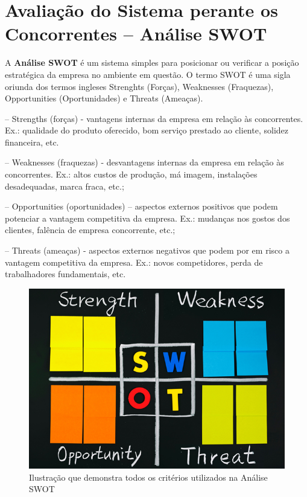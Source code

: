 \documentclass[graduacao,brazil]{ThesisPUC}
\begin{document}
\section{Avalia\c{c}\~{a}o do Sistema perante os Concorrentes -- An\'{a}lise SWOT}

A \textbf{An\'{a}lise SWOT} \'{e} um sistema simples para posicionar ou verificar a posi\c{c}\~{a}o estrat\'{e}gica
da empresa no ambiente em quest\~{a}o. O termo SWOT \'{e} uma sigla oriunda dos termos ingleses
Strenghts (Forças), Weaknesses (Fraquezas), Opportunities (Oportunidades) e Threats (Ameaças).

-- Strengths (forças) - vantagens internas da empresa em relação às concorrentes. Ex.:
qualidade do produto oferecido, bom serviço prestado ao cliente, solidez financeira, etc.

-- Weaknesses (fraquezas) - desvantagens internas da empresa em relação às concorrentes.
Ex.: altos custos de produção, má imagem, instalações desadequadas, marca fraca, etc.;

-- Opportunities (oportunidades) – aspectos externos positivos que podem potenciar a
vantagem competitiva da empresa. Ex.: mudanças nos gostos dos clientes, falência de
empresa concorrente, etc.;

-- Threats (ameaças) - aspectos externos negativos que podem por em risco a vantagem
competitiva da empresa. Ex.: novos competidores, perda de trabalhadores fundamentais,
etc.

\begin{figure}[H]
    \centering
    \includegraphics[width=\linewidth]{Imagens/swot.jpg}
    \caption{Ilustração que demonstra todos os critérios utilizados na Análise SWOT}
\end{figure}
\end{document}

